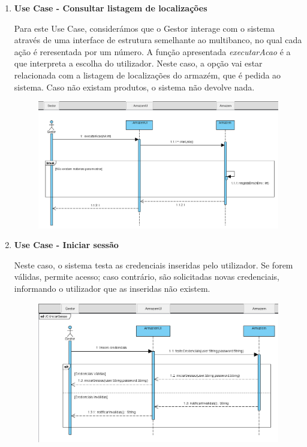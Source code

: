\documentclass[a4paper]{report}
\begin{document}
    \begin{enumerate}
       
    
    
        \item \textbf{Use Case - Consultar listagem de localizações}
            
            Para este Use Case, considerámos que o Gestor interage com o sistema através de uma interface de estrutura semelhante ao multibanco, no qual cada ação é reresentada por um número. A função apresentada \textit{executarAcao} é a que interpreta a escolha do utilizador. Neste caso, a opção vai estar relacionada com a listagem de localizações do armazém, que é pedida ao sistema. Caso não existam produtos, o sistema não devolve nada.
            
        \begin{figure}[H]
        \centering
        \includegraphics[scale=0.50]{images/UC-ConsultarListagem.PNG}
        \caption{}
        \end{figure}
        
       \pagebreak 
       \item \textbf{Use Case - Iniciar sessão}
            
            Neste caso, o sistema testa as credenciais inseridas pelo utilizador. Se forem válidas, permite acesso; caso contrário, são solicitadas novas credenciais, informando o utilizador que as inseridas não existem.
       
       \begin{figure}[H]
        \centering
        \includegraphics[scale=0.50]{images/UC-IniciarSessao.PNG}
        \caption{}
        \end{figure}
       

\end{enumerate}
\end{document}

